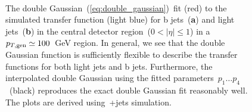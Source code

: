 \begin{figure}
\begin{centering}
 \\
\caption{The double Gaussian~(\cref{eq:double_gaussian})~fit (red) to the simulated transfer function (light blue) for b jets~(\textbf{a}) and light jets~(\textbf{b}) in the central detector region~($0 < |\eta| \le 1$) in a~$p_{T,\mathrm{gen}} \simeq 100$~GeV region. In general, we see that the double Gaussian function is sufficiently flexible to describe the transfer functions for both light jets and b jets. Furthermore, the interpolated double Gaussian using the fitted parameters~$p_1 \dots p_4$~(black) reproduces the exact double Gaussian fit reasonably well. The plots are derived using~\ttbar+jets simulation.}
\label{fig:transfer_perbin}
\end{centering}
\end{figure}

